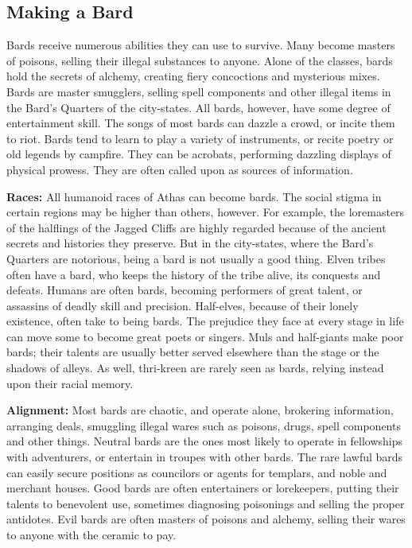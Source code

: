 
\subsection{Making a Bard}
Bards receive numerous abilities they can use to survive. Many become masters of poisons, selling their illegal substances to anyone. Alone of the classes, bards hold the secrets of alchemy, creating fiery concoctions and mysterious mixes. Bards are master smugglers, selling spell components and other illegal items in the Bard's Quarters of the city-states. All bards, however, have some degree of entertainment skill. The songs of most bards can dazzle a crowd, or incite them to riot. Bards tend to learn to play a variety of instruments, or recite poetry or old legends by campfire. They can be acrobats, performing dazzling displays of physical prowess. They are often called upon as sources of information.

\textbf{Races:} All humanoid races of Athas can become bards. The social stigma in certain regions may be higher than others, however. For example, the loremasters of the halflings of the Jagged Cliffs are highly regarded because of the ancient secrets and histories they preserve. But in the city-states, where the Bard's Quarters are notorious, being a bard is not usually a good thing. Elven tribes often have a bard, who keeps the history of the tribe alive, its conquests and defeats. Humans are often bards, becoming performers of great talent, or assassins of deadly skill and precision. Half-elves, because of their lonely existence, often take to being bards. The prejudice they face at every stage in life can move some to become great poets or singers. Muls and half-giants make poor bards; their talents are usually better served elsewhere than the stage or the shadows of alleys. As well, thri-kreen are rarely seen as bards, relying instead upon their racial memory.

\textbf{Alignment:} Most bards are chaotic, and operate alone, brokering information, arranging deals, smuggling illegal wares such as poisons, drugs, spell components and other things. Neutral bards are the ones most likely to operate in fellowships with adventurers, or entertain in troupes with other bards. The rare lawful bards can easily secure positions as councilors or agents for templars, and noble and merchant houses. Good bards are often entertainers or lorekeepers, putting their talents to benevolent use, sometimes diagnosing poisonings and selling the proper antidotes. Evil bards are often masters of poisons and alchemy, selling their wares to anyone with the ceramic to pay.

